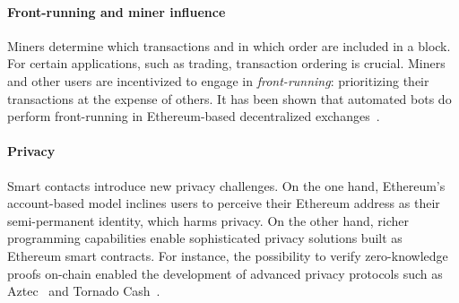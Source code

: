 \paragraph{Front-running and miner influence}
Miners determine which transactions and in which order are included in a block.
For certain applications, such as trading, transaction ordering is crucial.
Miners and other users are incentivized to engage in \textit{front-running}: prioritizing their transactions at the expense of others.
It has been shown that automated bots do perform front-running in Ethereum-based decentralized exchanges~\cite{Daian2019,Robinson2020}.

\paragraph{Privacy}
Smart contacts introduce new privacy challenges.
On the one hand, Ethereum's account-based model inclines users to perceive their Ethereum address as their semi-permanent identity, which harms privacy.
On the other hand, richer programming capabilities enable sophisticated privacy solutions built as Ethereum smart contracts.
For instance, the possibility to verify zero-knowledge proofs on-chain enabled the development of advanced privacy protocols such as Aztec~\cite{Aztec} and Tornado Cash~\cite{TornadoCash}.
